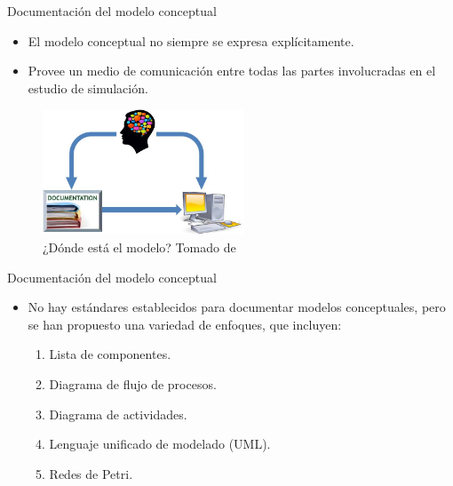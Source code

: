 \begin{frame}{Documentación del modelo conceptual}
    \begin{itemize}
        \item El modelo conceptual no siempre se expresa explícitamente.
	    \item Provee un medio de comunicación entre todas las partes involucradas en el estudio de simulación.
    \end{itemize}
    \begin{figure}
        \centering
        \includegraphics[width=6cm]{images/whereisthemodel.jpg}
        \caption{¿Dónde está el modelo? Tomado de \cite{robinson}}
    \end{figure}
\end{frame}

\begin{frame}{Documentación del modelo conceptual}
    \begin{itemize}
	    \item No hay estándares establecidos para documentar modelos conceptuales, pero se han propuesto una variedad de enfoques, que incluyen:
	    \begin{enumerate}
	        \item Lista de componentes.
	        \item Diagrama de flujo de procesos.
	        \item Diagrama de actividades.
	        \item Lenguaje unificado de modelado (UML).
	        \item Redes de Petri.
	    \end{enumerate}
    \end{itemize}
\end{frame}